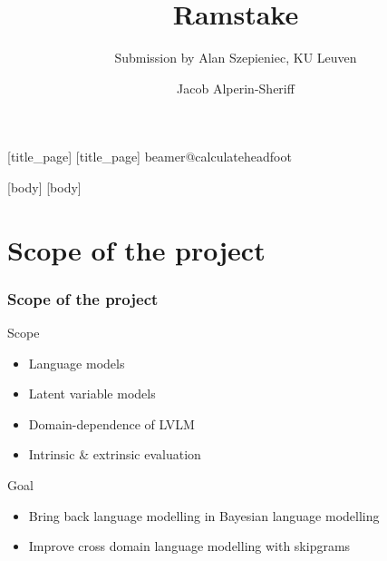 \documentclass[11pt,t]{beamer}
\title{Ramstake}
\subtitle{Submission by Alan Szepieniec, KU Leuven}
\author{Jacob Alperin-Sheriff}
\institute{NIST}
\begin{document}
    [title_page]
    [title_page]
    \csname beamer@calculateheadfoot\endcsname %
        \begin{frame}
            \titlepage
        \end{frame}
    [body]
    [body]


%
%
%
\section{Scope of the project}

\begin{frame}    
    \frametitle{Scope of the project}

    \begin{block}{Scope}
        \begin{itemize}
            \item Language models
            \item Latent variable models
            \item Domain-dependence of LVLM
            \item Intrinsic \& extrinsic evaluation
        \end{itemize}
    \end{block}

    \begin{block}{Goal}
        \begin{itemize}
            \item Bring back language modelling in Bayesian language modelling    
            \item Improve cross domain language modelling with skipgrams
        \end{itemize}
    \end{block}
\end{frame}
\end{document}
